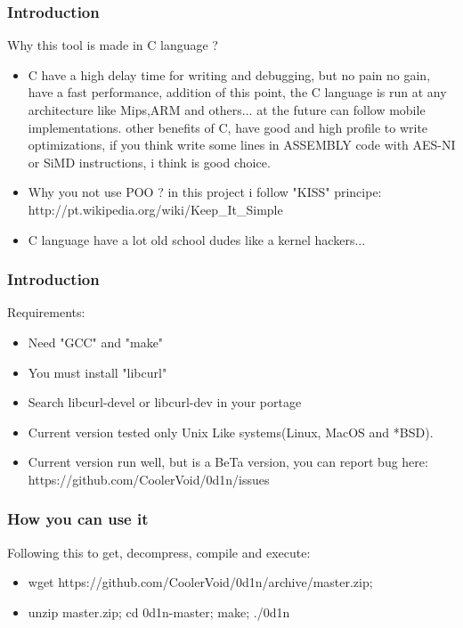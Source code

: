 \documentclass[serif,mathserif]{beamer}
\begin{document}
\begin{frame}
  \frametitle{Introduction}
  Why this tool is made in C language ?
  \begin{itemize}
  \item  C have a high delay time for writing and debugging, but no pain no gain, have a fast performance, addition of this point, the C language is run at any architecture like Mips,ARM and others... at the future can follow mobile implementations. other benefits of C,  have good and high profile to write optimizations, if you think write some lines in ASSEMBLY code with AES-NI or SiMD instructions, i think is good choice. 
  \item  Why you not use POO ? in this project i follow "KISS" principe: http://pt.wikipedia.org/wiki/Keep\_It\_Simple
  \item  C language have a lot old school dudes like a kernel hackers... 
  \end{itemize}
\end{frame}



\begin{frame}
  \frametitle{Introduction}
  Requirements:
  \begin{itemize}
  \item  Need "GCC" and "make" 
  \item  You must install "libcurl" 
  \item  Search libcurl-devel or libcurl-dev in your portage
  \item  Current version tested only Unix Like systems(Linux, MacOS and *BSD).
  \item  Current version run well, but is a BeTa version, you can report bug here: https://github.com/CoolerVoid/0d1n/issues 
  \end{itemize}
\end{frame}


\begin{frame}
  \frametitle{How you can use it}
  Following this to get, decompress, compile and execute:
  \begin{itemize}
  \item wget https://github.com/CoolerVoid/0d1n/archive/master.zip; 
  \item unzip master.zip; cd 0d1n-master; make; ./0d1n
  \end{itemize}
\end{frame}
\end{document}
